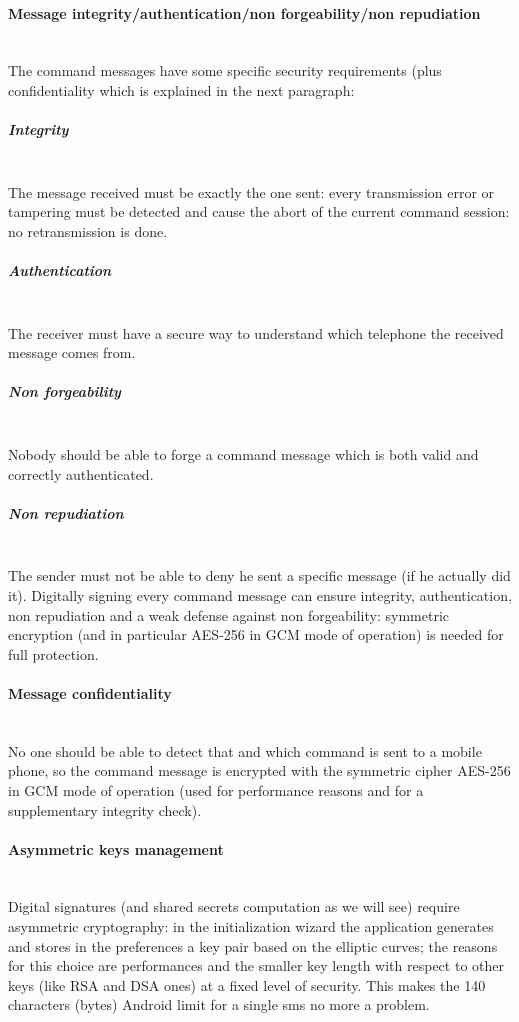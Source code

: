 \documentclass[a4paper,12pt]{article}
\begin{document}
\paragraph{Message integrity/authentication/non forgeability/non repudiation} \hspace{0pt} \\
\small{The command messages have some specific security requirements (plus confidentiality which is explained in the next paragraph:}
\subparagraph{\textit{Integrity}} \hspace{0pt} \\
\small{The message received must be exactly the one sent: every transmission error or tampering must be detected and cause the abort of the current command session: no retransmission is done.}
\subparagraph{\textit{Authentication}} \hspace{0pt} \\
\small{The receiver must have a secure way to understand which telephone the received message comes from.}
\subparagraph{\textit{Non forgeability}} \hspace{0pt} \\
\small{Nobody should be able to forge a command message which is both valid and correctly authenticated.}
\subparagraph{\textit{Non repudiation}} \hspace{0pt} \\
\small{The sender must not be able to deny he sent a specific message (if he actually did it).}
\vspace{25pt}
\newline
\small{Digitally signing every command message can ensure integrity, authentication, non repudiation and a weak defense against non forgeability: symmetric encryption (and in particular AES-256 in GCM mode of operation) is needed for full protection.}
\paragraph{Message confidentiality} \hspace{0pt} \\
\small{No one should be able to detect that and which command is sent to a mobile phone, so the command message is encrypted with the symmetric cipher AES-256 in GCM mode of operation (used for performance reasons and for a supplementary integrity check).}
\paragraph{Asymmetric keys management} \hspace{0pt} \\
\small{Digital signatures (and shared secrets computation as we will see) require asymmetric cryptography: in the initialization wizard the application generates and stores in the preferences a key pair based on the elliptic curves; the reasons for this choice are performances and the smaller key length with respect to other keys (like RSA and DSA ones) at a fixed level of security. This makes the 140 characters (bytes) Android limit for a single sms no more a problem.}
\end{document}

